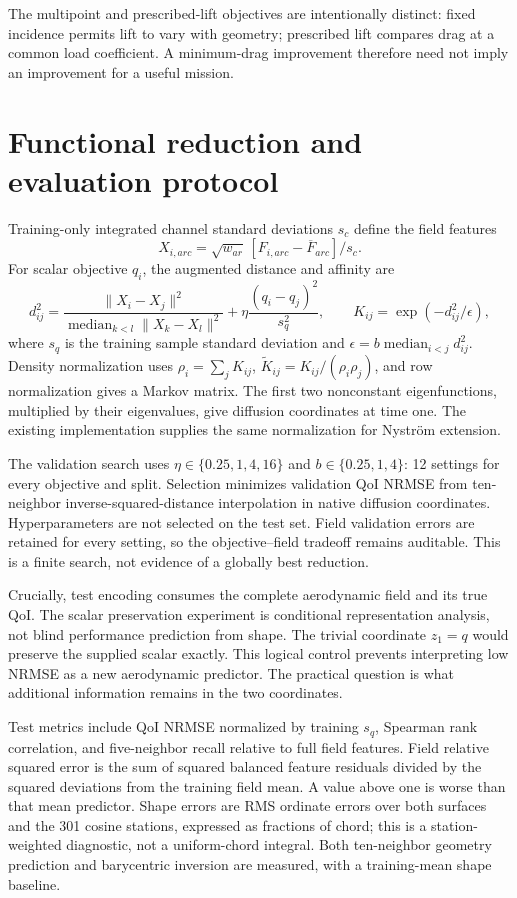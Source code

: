 \documentclass[11pt,a4paper]{article}
\begin{document}
The multipoint and prescribed-lift objectives are intentionally distinct: fixed incidence permits lift to vary with geometry; prescribed lift compares drag at a common load coefficient. A minimum-drag improvement therefore need not imply an improvement for a useful mission.

\section{Functional reduction and evaluation protocol}
Training-only integrated channel standard deviations $s_c$ define the field features
\[
 X_{i,arc}=\sqrt{w_{ar}}\,[F_{i,arc}-\overline F_{arc}]/s_c.
\]
For scalar objective $q_i$, the augmented distance and affinity are
\[
 d_{ij}^2=\frac{\|X_i-X_j\|^2}{\operatorname{median}_{k<l}\|X_k-X_l\|^2}
 +\eta\frac{(q_i-q_j)^2}{s_q^2},\qquad
 K_{ij}=\exp(-d_{ij}^2/\epsilon),
\]
where $s_q$ is the training sample standard deviation and $\epsilon=b\operatorname{median}_{i<j}d_{ij}^2$. Density normalization uses $\rho_i=\sum_j K_{ij}$, $\widetilde K_{ij}=K_{ij}/(\rho_i\rho_j)$, and row normalization gives a Markov matrix. The first two nonconstant eigenfunctions, multiplied by their eigenvalues, give diffusion coordinates at time one. The existing implementation supplies the same normalization for Nystr\"om extension.

The validation search uses $\eta\in\{0.25,1,4,16\}$ and $b\in\{0.25,1,4\}$: 12 settings for every objective and split. Selection minimizes validation QoI NRMSE from ten-neighbor inverse-squared-distance interpolation in native diffusion coordinates. Hyperparameters are not selected on the test set. Field validation errors are retained for every setting, so the objective--field tradeoff remains auditable. This is a finite search, not evidence of a globally best reduction.

Crucially, test encoding consumes the complete aerodynamic field and its true QoI. The scalar preservation experiment is conditional representation analysis, not blind performance prediction from shape. The trivial coordinate $z_1=q$ would preserve the supplied scalar exactly. This logical control prevents interpreting low NRMSE as a new aerodynamic predictor. The practical question is what additional information remains in the two coordinates.

Test metrics include QoI NRMSE normalized by training $s_q$, Spearman rank correlation, and five-neighbor recall relative to full field features. Field relative squared error is the sum of squared balanced feature residuals divided by the squared deviations from the training field mean. A value above one is worse than that mean predictor. Shape errors are RMS ordinate errors over both surfaces and the 301 cosine stations, expressed as fractions of chord; this is a station-weighted diagnostic, not a uniform-chord integral. Both ten-neighbor geometry prediction and barycentric inversion are measured, with a training-mean shape baseline.
\end{document}

